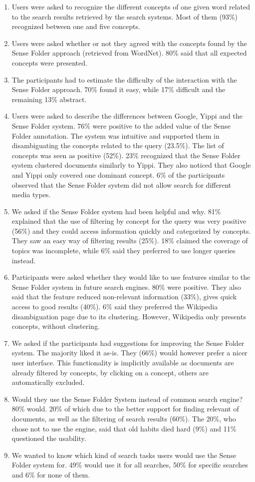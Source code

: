 \documentclass[output=paper]{LSP/langsci}
\begin{document}
\begin{enumerate}\sloppy
	\item Users were asked to recognize the different concepts of one given word related to the search results retrieved by the search systems. Most of them (93\%) recognized between one and five concepts.
	\item Users were asked whether or not they agreed with the concepts found by the Sense Folder approach (retrieved from WordNet). 80\% said that all expected concepts were presented.
	\item The participants had to estimate the difficulty of the interaction with the Sense Folder approach. 70\% found it easy, while 17\% difficult and the remaining 13\% abstract.
	\item Users were asked to describe the differences between Goo\-gle, Yippi and the Sense Folder system. 76\% were positive to the added value of the Sense Folder annotation. The system was intuitive and supported them in disambiguating the concepts related to the query (23.5\%). The list of concepts was seen as positive (52\%). 23\% recognized that the Sense Folder system clustered documents similarly to Yippi. They also noticed that Google and Yippi only covered one dominant concept. 6\% of the participants observed that the Sense Folder system did not allow search for different media types.
	\item We asked if the Sense Folder system had been helpful and why. 81\% explained that the use of filtering by concept for the query was very positive (56\%)  and they could access information quickly and categorized by concepts. They saw an easy way of filtering results (25\%). 18\% claimed the coverage of topics was incomplete, while 6\% said they preferred to use longer queries instead.
	\item Participants were asked whether they would like to use features similar to the Sense Folder system in future search engines. 80\% were positive. They also said that the feature reduced non-relevant information (33\%), gives quick access to good results (40\%). 6\% said they preferred the Wikipedia disambiguation page due to its clustering. However, Wikipedia only presents concepts, without clustering.
	\item We asked if the participants had suggestions for improving the Sense Folder system. The majority liked it as-is. They (66\%) would however prefer a nicer user interface. This functionality  is implicitly available as documents are already filtered by concepts, by clicking on a concept, others are automatically excluded.
	\item Would they use the Sense Folder System instead of common search engine? 80\% would. 20\% of which due to the better support for finding relevant of documents, as well as the filtering of search results (60\%). The 20\%,  who chose not to use the engine, said that old habits died hard (9\%) and 11\% questioned the usability.
	\item We wanted to know which kind of search tasks users would use the Sense Folder system for. 49\% would use it for all searches, 50\% for specific searches and 6\% for none of them.
\end{enumerate}
\end{document}
